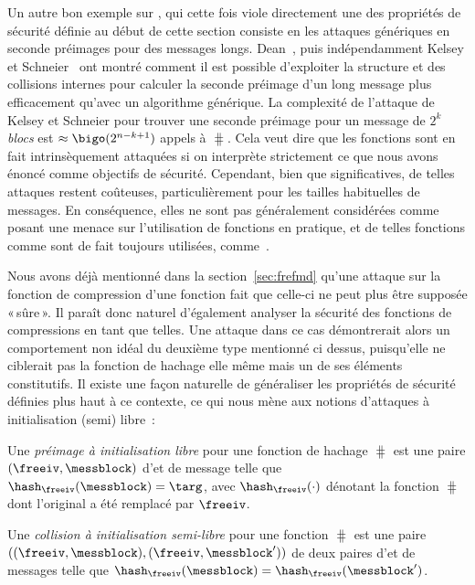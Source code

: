 Un autre bon exemple sur
\merkdam, qui cette fois viole directement une des propriétés de sécurité définie au début de cette section
consiste en les attaques génériques en seconde préimages pour des messages longs.
Dean~\cite{dean}, puis indépendamment Kelsey et Schneier~\cite{DBLP:conf/eurocrypt/KelseyS05}
ont montré comment il est possible d'exploiter la structure \merkdam et des collisions internes
pour calculer la seconde préimage d'un long message plus efficacement qu'avec un algorithme générique.
La complexité de l'attaque de Kelsey et Schneier pour trouver une seconde préimage pour un message de 
$2^k$ \emph{blocs} est $\approx \bigo(2^{n-k+1})$ appels à $\hash$. Cela veut dire que les fonctions \merkdam sont
en fait intrinsèquement attaquées si on interprète strictement ce que nous avons énoncé comme objectifs de sécurité.
Cependant, bien que significatives, de telles attaques restent coûteuses, particulièrement pour les tailles habituelles
de messages. En conséquence, elles ne sont pas généralement considérées comme posant une menace sur l'utilisation
de fonctions \merkdam en pratique, et de telles fonctions comme \shatwo sont de fait toujours utilisées, comme~\cite{Nist-SHA}.

\bigskip

Nous avons déjà mentionné dans la section~\ref{sec:frefmd} qu'une attaque sur la fonction de compression d'une fonction \merkdam fait que celle-ci
ne peut plus être supposée «\,sûre\,». Il paraît donc naturel d'également analyser la sécurité des fonctions de compressions en tant que telles.
Une attaque dans ce cas démontrerait alors un comportement non idéal du deuxième type mentionné ci dessus, puisqu'elle ne ciblerait
pas la fonction de hachage elle même mais un de ses éléments constitutifs. Il existe une façon naturelle de généraliser les propriétés
de sécurité définies plus haut à ce contexte, ce qui nous mène aux notions d'attaques à initialisation (semi) libre~:

\begin{fdefi}
Une 
\emph{préimage à initialisation libre}
pour une fonction de hachage \merkdam $\hash$ est une paire $(\freeiv,\messblock)$
d'\iv et de message telle que $\hash_\freeiv(\messblock) = \targ$, avec $\hash_\freeiv(\cdot)$ dénotant
la fonction $\hash$ dont l'\iv original a été remplacé par $\freeiv$.
\end{fdefi}

\begin{fdefi}
Une \emph{collision à initialisation semi-libre} pour une fonction \merkdam $\hash$ est une paire $((\freeiv,\messblock), (\freeiv,\messblock'))$
de deux paires d'\iv et de messages telle que $\hash_\freeiv(\messblock) = \hash_{\freeiv}(\messblock')$.
\end{fdefi}

